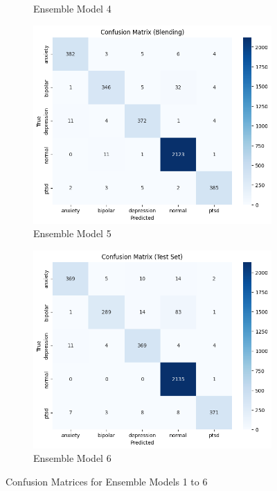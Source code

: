 \begin{figure}[H]
\begin{subfigure}[b]{0.49\textwidth}
        \caption*{Ensemble Model 4}
        \label{bag cm}  %
    \end{subfigure}
    \hfill
    \begin{subfigure}[b]{0.49\textwidth}
        \centering
        \includegraphics[width=\textwidth]{Images/BLD CM.png}
        \caption*{Ensemble Model 5}
        \label{bld cm}  %
    \end{subfigure}
    \hfill
    \begin{subfigure}[b]{0.49\textwidth}
        \centering
        \includegraphics[width=\textwidth]{Images/WV CM.png}
        \caption*{Ensemble Model 6}
        \label{wv cm}  %
    \end{subfigure}
    \label{fig:ensemble_model_comparison}
    \caption*{Confusion Matrices for Ensemble Models 1 to 6}
\end{figure}

